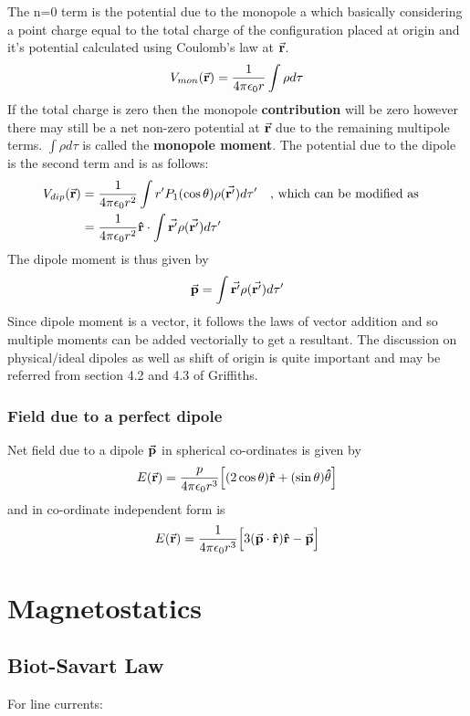 \documentclass[12pt, oneside]{book}
\begin{document}
The n=0 term is the potential due to the monopole a which basically considering a point charge equal to the total charge of the configuration placed at origin and it's potential calculated using Coulomb's law at $\va{r}$.
\begin{equation}
	V_{mon}(\va{r})=\dfrac{1}{4\pi \epsilon_0 r}\int\rho d\tau
\end{equation}
If the total charge is zero then the monopole \textbf{contribution} will be zero however there may still be a net non-zero potential at $\va{r}$ due to the remaining multipole terms. $\int\rho d\tau$ is called the \textbf{monopole moment}. The potential due to the dipole is the second term and is as follows:
\begin{align}
	V_{dip}(\va{r})&=\dfrac{1}{4\pi \epsilon_0 r^2}\int r' P_1(\cos\theta)\rho(\va{r'})d\tau' \qq{, which can be modified as} \\
	&=\dfrac{1}{4\pi \epsilon_0 r^2}\vu{r}\cdot\int \va{r'}\rho(\va{r'})d\tau'
\end{align}
The dipole moment is thus given by 
\begin{equation}
	\va{p}=\int \va{r'} \rho(\va{r'})d\tau'
\end{equation}
Since dipole moment is a vector, it follows the laws of vector addition and so multiple moments can be added vectorially to get a resultant. The discussion on physical/ideal dipoles as well as shift of origin is quite important and may be referred from section 4.2 and 4.3 of Griffiths. 

\subsection{Field due to a perfect dipole}
Net field due to a dipole $\va{p}$ in spherical co-ordinates is given by
\begin{equation}
	E(\va{r})=\dfrac{p}{4\pi \epsilon_0 r^3}\Big[(2\cos\theta)\vu{r}+(\sin\theta)\vu{\theta}\Big]
\end{equation}
and in co-ordinate independent form is 
\begin{equation}
	E(\va{r})=\dfrac{1}{4\pi \epsilon_0 r^3}\Big[3(\va{p}\cdot\vu{r})\vu{r}-\va{p}\Big]
\end{equation}

\chapter{Magnetostatics}
\section{Biot-Savart Law}
For line currents:
\end{document}

